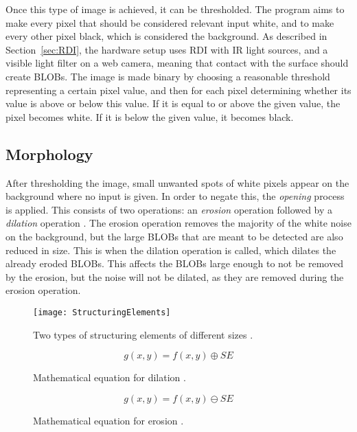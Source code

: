 Once this type of image is achieved, it can be thresholded. The program aims to make every pixel that should be considered relevant input white, and to make every other pixel black, which is considered the background. As described in Section~\ref{sec:RDI}, the hardware setup uses RDI with IR light sources, and a visible light filter on a web camera, meaning that contact with the surface should create BLOBs. The image is made binary by choosing a reasonable threshold representing a certain pixel value, and then for each pixel determining whether its value is above or below this value. If it is equal to or above the given value, the pixel becomes white. If it is below the given value, it becomes black.
 
\subsection{Morphology}
After thresholding the image, small unwanted spots of white pixels appear on the background where no input is given. In order to negate this, the \textit{opening} process is applied. This consists of two operations: an \textit{erosion} operation followed by a \textit{dilation} operation \citep{moeslund_introduction_2012}. The erosion operation removes the majority of the white noise on the background, but the large BLOBs that are meant to be detected are also reduced in size. This is when the dilation operation is called, which dilates the already eroded BLOBs. This affects the BLOBs large enough to not be removed by the erosion, but the noise will not be dilated, as they are removed during the erosion operation.

\begin{figure}[!h]
	\centering
\texttt{[image: StructuringElements]}
\caption{Two types of structuring elements of different sizes \citep{moeslund_introduction_2012}. \label{fig:StructuringElements}}
\end{figure}

\begin{figure}[!h]
	\centering
	\begin{displaymath}
	g(x, y) = f(x, y) \oplus SE
	\end{displaymath}
	\caption{Mathematical equation for dilation \citep{moeslund_introduction_2012}. \label{fig:dilateEquation}}
\end{figure}

\begin{figure}[!h]
	\centering
	\begin{displaymath}
	g(x, y) = f(x, y) \ominus SE
	\end{displaymath}
	\caption{Mathematical equation for erosion \citep{moeslund_introduction_2012}. \label{fig:erodeEquation}}
\end{figure}

